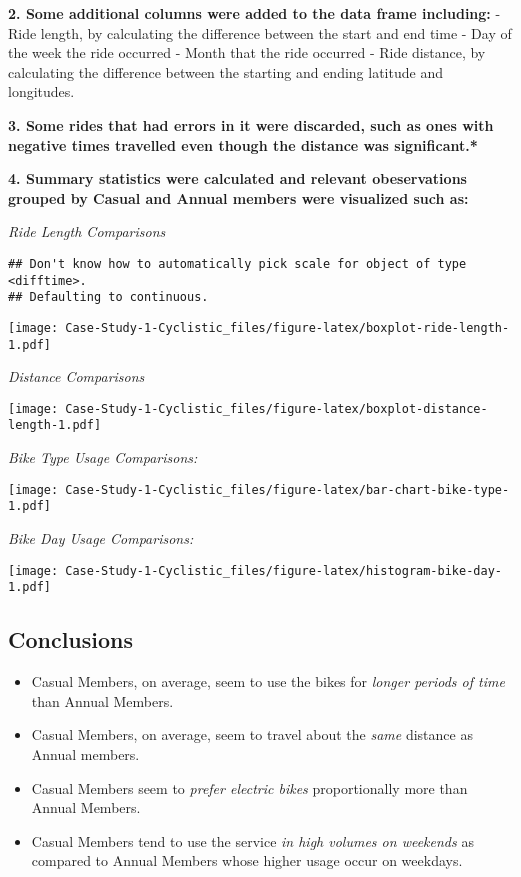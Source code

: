 \documentclass[
]{article}
\providecommand{\tightlist}{%
  \setlength{\itemsep}{0pt}\setlength{\parskip}{0pt}}
\begin{document}
\textbf{2. Some additional columns were added to the data frame
including:} - Ride length, by calculating the difference between the
start and end time - Day of the week the ride occurred - Month that the
ride occurred - Ride distance, by calculating the difference between the
starting and ending latitude and longitudes.

\textbf{3. Some rides that had errors in it were discarded, such as ones
with negative times travelled even though the distance was significant.*
}

\textbf{4. Summary statistics were calculated and relevant obeservations
grouped by Casual and Annual members were visualized such as:}

\emph{Ride Length Comparisons}

\begin{verbatim}
## Don't know how to automatically pick scale for object of type <difftime>.
## Defaulting to continuous.
\end{verbatim}

\texttt{[image: Case-Study-1-Cyclistic\_files/figure-latex/boxplot-ride-length-1.pdf]}

\emph{Distance Comparisons}

\texttt{[image: Case-Study-1-Cyclistic\_files/figure-latex/boxplot-distance-length-1.pdf]}

\emph{Bike Type Usage Comparisons:}

\texttt{[image: Case-Study-1-Cyclistic\_files/figure-latex/bar-chart-bike-type-1.pdf]}

\emph{Bike Day Usage Comparisons:}

\texttt{[image: Case-Study-1-Cyclistic\_files/figure-latex/histogram-bike-day-1.pdf]}

\hypertarget{conclusions}{%
\subsection{Conclusions}\label{conclusions}}

\begin{itemize}
\tightlist
\item
  Casual Members, on average, seem to use the bikes for \emph{longer
  periods of time} than Annual Members.
\item
  Casual Members, on average, seem to travel about the \emph{same}
  distance as Annual members.
\item
  Casual Members seem to \emph{prefer electric bikes} proportionally
  more than Annual Members.
\item
  Casual Members tend to use the service \emph{in high volumes on
  weekends} as compared to Annual Members whose higher usage occur on
  weekdays.
\end{itemize}
\end{document}
